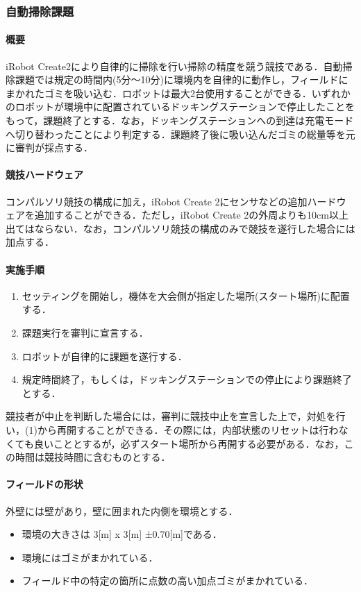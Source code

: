 \documentclass[submit]{ipsj}
\begin{document}
\subsubsection{自動掃除課題}
\paragraph*{概要}

iRobot Create2により自律的に掃除を行い掃除の精度を競う競技である．自動掃除課題では規定の時間内(5分〜10分)に環境内を自律的に動作し，フィールドにまかれたゴミを吸い込む．ロボットは最大2台使用することができる．いずれかのロボットが環境中に配置されているドッキングステーションで停止したことをもって，課題終了とする．なお，ドッキングステーションへの到達は充電モードへ切り替わったことにより判定する．課題終了後に吸い込んだゴミの総量等を元に審判が採点する．

\paragraph*{競技ハードウェア}

コンパルソリ競技の構成に加え，iRobot Create 2にセンサなどの追加ハードウェアを追加することができる．ただし，iRobot Create 2の外周よりも10cm以上出てはならない．なお，コンパルソリ競技の構成のみで競技を遂行した場合には加点する．

\paragraph*{実施手順}

\begin{enumerate}
\item セッティングを開始し，機体を大会側が指定した場所(スタート場所)に配置する．
\item 課題実行を審判に宣言する．
\item ロボットが自律的に課題を遂行する．
\item 規定時間終了，もしくは，ドッキングステーションでの停止により課題終了とする．
\end{enumerate}

競技者が中止を判断した場合には，審判に競技中止を宣言した上で，対処を行い，(1)から再開することができる．その際には，内部状態のリセットは行わなくても良いこととするが，必ずスタート場所から再開する必要がある．なお，この時間は競技時間に含むものとする．

\paragraph*{フィールドの形状}
外壁には壁があり，壁に囲まれた内側を環境とする．
\begin{itemize}
\item 環境の大きさは 3[m] x 3[m] ±0.70[m]である．
\item 環境にはゴミがまかれている．
\item フィールド中の特定の箇所に点数の高い加点ゴミがまかれている．
\end{itemize}
\end{document}

